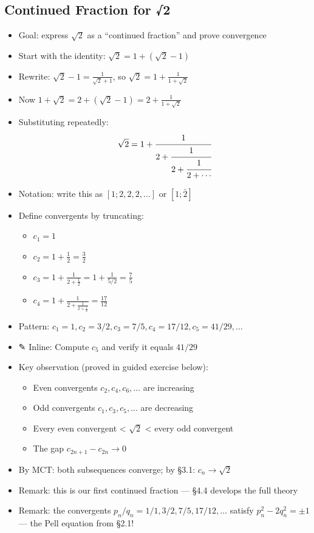 \documentclass[
  10pt,
  letterpaper,
]{scrbook}
\providecommand{\tightlist}{%
  \setlength{\itemsep}{0pt}\setlength{\parskip}{0pt}}
\begin{document}
\subsection{Continued Fraction for √2}\label{continued-fraction-for-2}

\begin{itemize}
\tightlist
\item
  Goal: express \(\sqrt{2}\) as a ``continued fraction'' and prove
  convergence
\item
  Start with the identity: \(\sqrt{2} = 1 + (\sqrt{2} - 1)\)
\item
  Rewrite: \(\sqrt{2} - 1 = \frac{1}{\sqrt{2} + 1}\), so
  \(\sqrt{2} = 1 + \frac{1}{1 + \sqrt{2}}\)
\item
  Now \(1 + \sqrt{2} = 2 + (\sqrt{2} - 1) = 2 + \frac{1}{1 + \sqrt{2}}\)
\item
  Substituting repeatedly:
  \[\sqrt{2} = 1 + \cfrac{1}{2 + \cfrac{1}{2 + \cfrac{1}{2 + \cdots}}}\]
\item
  Notation: write this as \([1; 2, 2, 2, \ldots]\) or \([1; \bar{2}]\)
\item
  Define convergents by truncating:

  \begin{itemize}
  \tightlist
  \item
    \(c_1 = 1\)
  \item
    \(c_2 = 1 + \frac{1}{2} = \frac{3}{2}\)
  \item
    \(c_3 = 1 + \frac{1}{2 + \frac{1}{2}} = 1 + \frac{1}{5/2} = \frac{7}{5}\)
  \item
    \(c_4 = 1 + \frac{1}{2 + \frac{1}{2 + \frac{1}{2}}} = \frac{17}{12}\)
  \end{itemize}
\item
  Pattern:
  \(c_1 = 1, c_2 = 3/2, c_3 = 7/5, c_4 = 17/12, c_5 = 41/29, \ldots\)
\item
  ✎ Inline: Compute \(c_5\) and verify it equals \(41/29\)
\item
  Key observation (proved in guided exercise below):

  \begin{itemize}
  \tightlist
  \item
    Even convergents \(c_2, c_4, c_6, \ldots\) are increasing
  \item
    Odd convergents \(c_1, c_3, c_5, \ldots\) are decreasing
  \item
    Every even convergent \textless{} \(\sqrt{2}\) \textless{} every odd
    convergent
  \item
    The gap \(c_{2n+1} - c_{2n} \to 0\)
  \end{itemize}
\item
  By MCT: both subsequences converge; by §3.1: \(c_n \to \sqrt{2}\)
\item
  Remark: this is our first continued fraction --- §4.4 develops the
  full theory
\item
  Remark: the convergents \(p_n/q_n = 1/1, 3/2, 7/5, 17/12, \ldots\)
  satisfy \(p_n^2 - 2q_n^2 = \pm 1\) --- the Pell equation from §2.1!
\end{itemize}
\end{document}
